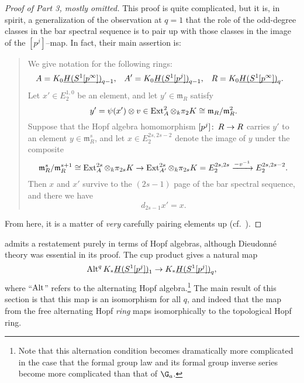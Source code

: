 \begin{proof}[Proof of Part 3, mostly omitted]
This proof is quite complicated, but it is, in spirit, a generalization of the observation at $q = 1$ that the role of the odd-degree classes in the bar spectral sequence is to pair up with those classes in the image of the $[p^j]$--map.  In fact, their main assertion is:
\begin{quote}
We give notation for the following rings:
\begin{align*}
A & = K_0 \underline{\smash{H(S^1[p^\infty])}}_{q-1}, &
A' & = K_0 \underline{\smash{H(S^1[p^j])}}_{q-1}, &
R & = K_0 \underline{\smash{H(S^1[p^\infty])}}_{q}.
\end{align*}
Let $x' \in E_2^{1, 0}$ be an element, and let $y' \in \mathfrak m_R$ satisfy \[y' = \psi(x') \otimes v \in \operatorname{Ext}^2_A \otimes_k \pi_2 K \cong \mathfrak m_R / \mathfrak m_R^2.\]  Suppose that the Hopf algebra homomorphism $[p^j]\colon\thinspace R \to R$ carries $y'$ to an element $y \in \mathfrak m_R^s$, and let $x \in E_2^{2s, 2s-2}$ denote the image of $y$ under the composite \[\mathfrak m_R^s / \mathfrak m_R^{s+1} \cong \operatorname{Ext}_A^{2s} \otimes_k \pi_{2s} K \to \operatorname{Ext}_{A'}^{2s} \otimes_k \pi_{2s} K = E_2^{2s, 2s} \xrightarrow{-v^{-1}} E_2^{2s, 2s-2}.\]  Then $x$ and $x'$ survive to the $(2s - 1)${\th} page of the bar spectral sequence, and there we have \[d_{2s-1} x' = x.\]
\end{quote}
From here, it is a matter of \emph{very} carefully pairing elements up (cf.\ \cite[pg.\ 60]{HopkinsLurie}).
\end{proof}

\begin{remark}
 admits a restatement purely in terms of Hopf algebras, although Dieudonn\'e theory was essential in its proof.  The cup product gives a natural map \[\operatorname{Alt}^q K_* \underline{\smash{H(S^1[p^j])}}_{1} \to K_* \underline{\smash{H(S^1[p^j])}}_{q},\] where ``$\operatorname{Alt}$'' refers to the alternating Hopf algebra.\footnote{Note that this alternation condition becomes dramatically more complicated in the case that the formal group law and its formal group inverse series become more complicated than that of $\G_a$.}  The main result of this section is that this map is an isomorphism for all $q$, and indeed that the map from the free alternating Hopf \emph{ring} maps isomorphically to the topological Hopf ring.
\end{remark}

